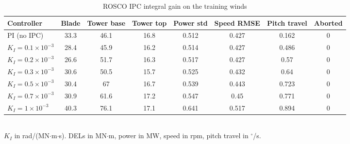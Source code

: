 \begin{table}[!t]
\centering
\caption{ROSCO IPC integral gain on the training winds}
\label{tab:sweep}
\renewcommand{\arraystretch}{1.15}
\begin{tabular}{lccccccc}
\hline\hline
Controller & Blade & Tower base & Tower top & Power std & Speed RMSE & Pitch travel & Aborted \\
\hline
PI (no IPC) & 33.3 & 46.1 & 16.8 & 0.512 & 0.427 & 0.162 & 0 \\
$K_I = 0.1\times10^{-3}$ & 28.4 & 45.9 & 16.2 & 0.514 & 0.427 & 0.486 & 0 \\
$K_I = 0.2\times10^{-3}$ & 26.6 & 51.7 & 16.3 & 0.517 & 0.427 & 0.57 & 0 \\
$K_I = 0.3\times10^{-3}$ & 30.6 & 50.5 & 15.7 & 0.525 & 0.432 & 0.64 & 0 \\
$K_I = 0.5\times10^{-3}$ & 30.4 & 67 & 16.7 & 0.539 & 0.443 & 0.723 & 0 \\
$K_I = 0.7\times10^{-3}$ & 30.9 & 61.6 & 17.2 & 0.547 & 0.45 & 0.771 & 0 \\
$K_I = 1\times10^{-3}$ & 40.3 & 76.1 & 17.1 & 0.641 & 0.517 & 0.894 & 0 \\
\hline\hline
\end{tabular}
\\[2pt]\footnotesize $K_I$ in rad/(MN$\cdot$m$\cdot$s). DELs in MN$\cdot$m, power in MW, speed in rpm, pitch travel in $^\circ$/s.
\end{table}
